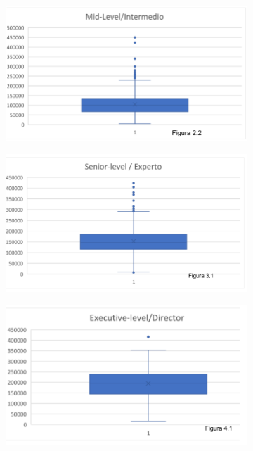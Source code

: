 \documentclass{article}
\begin{document}
	\begin{figure}
		\begin{subfigure}[b]{1.1\textwidth}
			\includegraphics[width=\textwidth]{FigurasTablas/figura2.2diagrama.png}
			\label{figura 2.2 diagrama}
		\end{subfigure}		
	\end{figure}
	\begin{figure}[htbp] %
		\begin{subfigure}[b]{1.1\textwidth}
			\includegraphics[width=\textwidth]{FigurasTablas/figura3.1diagrama.png}
			\label{figura 3.1 diagrama}
		\end{subfigure}	
		
		\begin{subfigure}[b]{1.1\textwidth}
			\includegraphics[width=\textwidth]{FigurasTablas/figura4.1diagrama.png}
			\label{figura 4.1 diagrama}
		\end{subfigure}	
	\end{figure}
\end{document}
